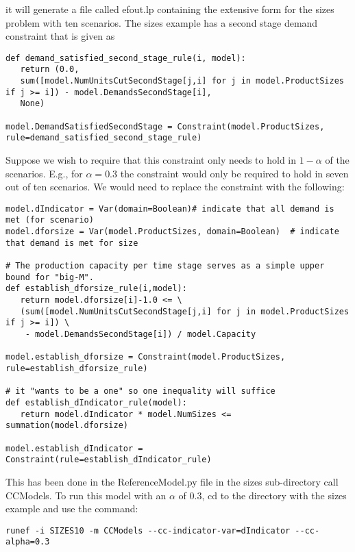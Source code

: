 it will generate a file called efout.lp containing the extensive form for the sizes problem with
ten scenarios. The sizes example has a second stage demand constraint that is given as

\begin{verbatim}
def demand_satisfied_second_stage_rule(i, model):
   return (0.0, 
   sum([model.NumUnitsCutSecondStage[j,i] for j in model.ProductSizes if j >= i]) - model.DemandsSecondStage[i], 
   None)    

model.DemandSatisfiedSecondStage = Constraint(model.ProductSizes, rule=demand_satisfied_second_stage_rule)
\end{verbatim}

Suppose we wish to require that this constraint only needs to hold in $1-\alpha$ of the scenarios. E.g., for
$\alpha=0.3$ the constraint would only be required to hold in seven out of ten scenarios. We would
need to replace the constraint with the following:

\begin{verbatim}
model.dIndicator = Var(domain=Boolean)# indicate that all demand is met (for scenario)
model.dforsize = Var(model.ProductSizes, domain=Boolean)  # indicate that demand is met for size

# The production capacity per time stage serves as a simple upper bound for "big-M".
def establish_dforsize_rule(i,model):
   return model.dforsize[i]-1.0 <= \
   (sum([model.NumUnitsCutSecondStage[j,i] for j in model.ProductSizes if j >= i]) \
    - model.DemandsSecondStage[i]) / model.Capacity

model.establish_dforsize = Constraint(model.ProductSizes, rule=establish_dforsize_rule)

# it "wants to be a one" so one inequality will suffice
def establish_dIndicator_rule(model):
   return model.dIndicator * model.NumSizes <= summation(model.dforsize)

model.establish_dIndicator = Constraint(rule=establish_dIndicator_rule)
\end{verbatim}

This has been done in the ReferenceModel.py file in the sizes sub-directory call CCModels.
To run this model with an $\alpha$ of 0.3, cd to the directory with the sizes
example and use the command:

\begin{verbatim}
runef -i SIZES10 -m CCModels --cc-indicator-var=dIndicator --cc-alpha=0.3
\end{verbatim}

